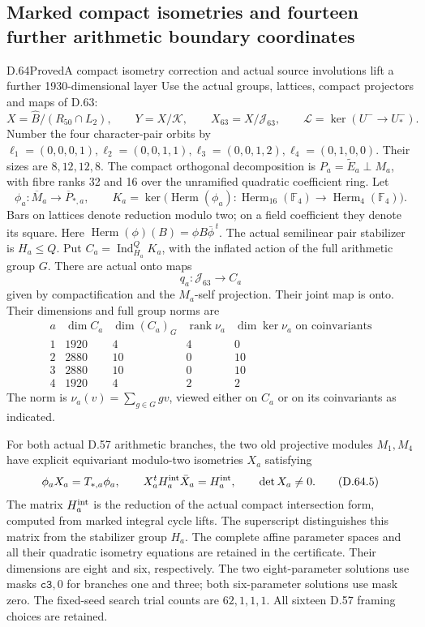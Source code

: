 \subsection{Marked compact isometries and fourteen further arithmetic boundary coordinates}

\begin{statement}{D.64}{Proved}{A compact isometry correction and actual source involutions lift a further 1930-dimensional layer}
Use the actual groups, lattices, compact projectors and maps of D.63:
\[
 X=\widehat B/(R_{50}\cap L_2),\qquad
 Y=X/\mathcal K,\qquad X_{63}=X/\mathcal J_{63},\qquad
 \mathcal L=\ker(U^-\longrightarrow U_*^-).
 \tag{D.64.1}
\]
Number the four character-pair orbits by
\(\ell_1=(0,0,0,1),\ell_2=(0,0,1,1),
\ell_3=(0,0,1,2),\ell_4=(0,1,0,0)\).
Their sizes are \(8,12,12,8\).
The compact orthogonal decomposition is
\(P_a=\widetilde E_a\perp M_a\), with fibre ranks
32 and 16 over the unramified quadratic coefficient ring.
Let
\[
 \phi_a:\overline M_a\longrightarrow \overline P_{*,a},
 \qquad
 K_a=\ker\bigl(\operatorname{Herm}(\phi_a):
       \operatorname{Herm}_{16}(\mathbb F_4)
       \longrightarrow\operatorname{Herm}_{4}(\mathbb F_4)\bigr).
 \tag{D.64.2}
\]
Bars on lattices denote reduction modulo two;
on a field coefficient they denote its square.
Here \(\operatorname{Herm}(\phi)(B)=\phi B\bar\phi^{\,t}\).
The actual semilinear pair stabilizer is \(H_a\leq Q\).
Put \(C_a=\operatorname{Ind}_{H_a}^{Q}K_a\), with the
inflated action of the full arithmetic group \(G\).
There are actual onto maps
\[
             q_a:\mathcal J_{63}\longrightarrow C_a
 \tag{D.64.3}
\]
given by compactification and the \(M_a\)-self projection.
Their joint map is onto. Their dimensions and full group norms are
\[
 \begin{array}{c|r|r|r|r}
 a&\dim C_a&\dim(C_a)_G&\operatorname{rank}\nu_a
                      &\dim\ker\nu_a\text{ on coinvariants}\\\hline
 1&1920&4&4&0\\
 2&2880&10&0&10\\
 3&2880&10&0&10\\
 4&1920&4&2&2
 \end{array}
 \tag{D.64.4}
\]
The norm is \(\nu_a(v)=\sum_{g\in G}gv\), viewed either
on \(C_a\) or on its coinvariants as indicated.

For both actual D.57 arithmetic branches, the two old
projective modules \(M_1,M_4\) have explicit equivariant
modulo-two isometries \(X_a\) satisfying
\[
 \phi_aX_a=T_{*,a}\phi_a,\qquad
 X_a^t H_a^{\rm int}\bar X_a=H_a^{\rm int},
 \qquad\det X_a\ne0.
 \tag{D.64.5}
\]
The matrix \(H_a^{\rm int}\) is the reduction of the
actual compact intersection form, computed from marked
integral cycle lifts. The superscript distinguishes this
matrix from the stabilizer group \(H_a\).
The complete affine parameter spaces and all their quadratic
isometry equations are retained in the certificate. Their
dimensions are eight and six, respectively. The two
eight-parameter solutions use masks \(\mathtt{c3},0\)
for branches one and three; both six-parameter solutions
use mask zero. The fixed-seed search trial counts are
\(62,1,1,1\). All sixteen D.57 framing choices are retained.


\end{statement}
